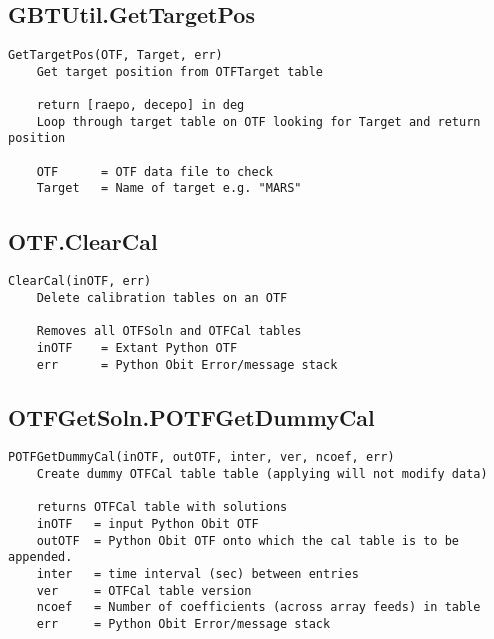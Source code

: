 \documentclass[11pt]{report}
\begin{document}
\subsection{GBTUtil.GetTargetPos}
\begin{verbatim}
GetTargetPos(OTF, Target, err)
    Get target position from OTFTarget table
    
    return [raepo, decepo] in deg
    Loop through target table on OTF looking for Target and return position
    
    OTF      = OTF data file to check
    Target   = Name of target e.g. "MARS"
\end{verbatim}

\subsection{OTF.ClearCal}
\begin{verbatim}
ClearCal(inOTF, err)
    Delete calibration tables on an OTF
    
    Removes all OTFSoln and OTFCal tables
    inOTF    = Extant Python OTF
    err      = Python Obit Error/message stack
\end{verbatim}

\subsection{OTFGetSoln.POTFGetDummyCal}
\begin{verbatim}
POTFGetDummyCal(inOTF, outOTF, inter, ver, ncoef, err)
    Create dummy OTFCal table table (applying will not modify data)
    
    returns OTFCal table with solutions
    inOTF   = input Python Obit OTF 
    outOTF  = Python Obit OTF onto which the cal table is to be appended.
    inter   = time interval (sec) between entries
    ver     = OTFCal table version
    ncoef   = Number of coefficients (across array feeds) in table
    err     = Python Obit Error/message stack
\end{verbatim}
\end{document}
